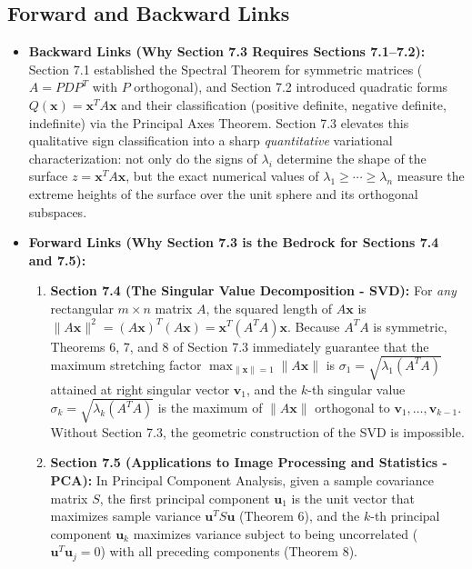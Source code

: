 \documentclass[11pt, letterpaper]{article}
\theoremstyle{definition}
\theoremstyle{remark}
\begin{document}
\subsection{Forward and Backward Links}
\begin{itemize}
    \item \textbf{Backward Links (Why Section 7.3 Requires Sections 7.1--7.2):}
    Section 7.1 established the Spectral Theorem for symmetric matrices ($A = P D P^T$ with $P$ orthogonal), and Section 7.2 introduced quadratic forms $Q(\mathbf{x}) = \mathbf{x}^T A \mathbf{x}$ and their classification (positive definite, negative definite, indefinite) via the Principal Axes Theorem. Section 7.3 elevates this qualitative sign classification into a sharp \emph{quantitative} variational characterization: not only do the signs of $\lambda_i$ determine the shape of the surface $z = \mathbf{x}^T A \mathbf{x}$, but the exact numerical values of $\lambda_1 \ge \cdots \ge \lambda_n$ measure the extreme heights of the surface over the unit sphere and its orthogonal subspaces.
    \item \textbf{Forward Links (Why Section 7.3 is the Bedrock for Sections 7.4 and 7.5):}
    \begin{enumerate}[label=\arabic*.]
        \item \textbf{Section 7.4 (The Singular Value Decomposition - SVD):} For \emph{any} rectangular $m \times n$ matrix $A$, the squared length of $A\mathbf{x}$ is $\|A\mathbf{x}\|^2 = (A\mathbf{x})^T(A\mathbf{x}) = \mathbf{x}^T (A^T A)\mathbf{x}$. Because $A^T A$ is symmetric, Theorems 6, 7, and 8 of Section 7.3 immediately guarantee that the maximum stretching factor $\max_{\|\mathbf{x}\|=1} \|A\mathbf{x}\|$ is $\sigma_1 = \sqrt{\lambda_1(A^T A)}$ attained at right singular vector $\mathbf{v}_1$, and the $k$-th singular value $\sigma_k = \sqrt{\lambda_k(A^T A)}$ is the maximum of $\|A\mathbf{x}\|$ orthogonal to $\mathbf{v}_1, \dots, \mathbf{v}_{k-1}$. Without Section 7.3, the geometric construction of the SVD is impossible.
        \item \textbf{Section 7.5 (Applications to Image Processing and Statistics - PCA):} In Principal Component Analysis, given a sample covariance matrix $S$, the first principal component $\mathbf{u}_1$ is the unit vector that maximizes sample variance $\mathbf{u}^T S \mathbf{u}$ (Theorem 6), and the $k$-th principal component $\mathbf{u}_k$ maximizes variance subject to being uncorrelated ($\mathbf{u}^T \mathbf{u}_j = 0$) with all preceding components (Theorem 8).
    \end{enumerate}
\end{itemize}
\end{document}
